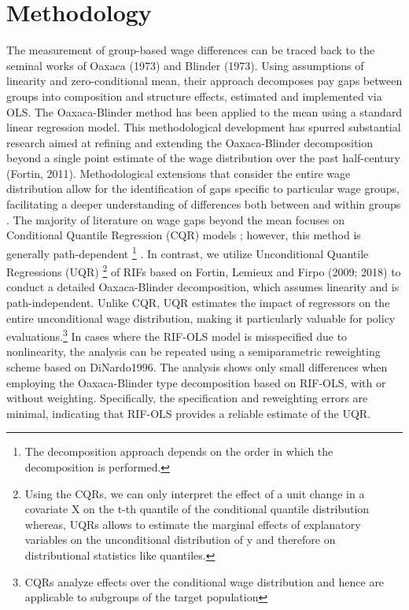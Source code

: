 \section{Methodology}

The measurement of group-based wage differences can be traced back to the seminal works of Oaxaca (1973) and Blinder (1973). Using assumptions of linearity and zero-conditional mean, their approach decomposes pay gaps between groups into composition and structure effects, estimated and implemented via OLS. The Oaxaca-Blinder method has been applied to the mean using a standard linear regression model. This methodological development has spurred substantial research aimed at refining and extending the Oaxaca-Blinder decomposition beyond a single point estimate of the wage distribution over the past half-century (Fortin, 2011). Methodological extensions that consider the entire wage distribution allow for the identification of gaps specific to particular wage groups, facilitating a deeper understanding of differences both between and within groups \parencite{Machado2005}. The majority of literature on wage gaps beyond the mean focuses on Conditional Quantile Regression (CQR) models \parencite{Machado2005, Buchinsky1998} ; however, this method is generally path-dependent \footnote{The decomposition approach depends on the order in which the decomposition is performed.} \parencite{Fortin2011}. In contrast, we utilize Unconditional Quantile Regressions (UQR) \footnote{Using the CQRs, we can only interpret the effect of a unit change in a covariate X on the t-th quantile of the conditional quantile distribution whereas, UQRs allows to estimate the marginal effects of explanatory variables on the unconditional distribution of y and therefore on distributional statistics like quantiles.} of RIFs based on Fortin, Lemieux and Firpo (2009; 2018) to conduct a detailed Oaxaca-Blinder decomposition, which assumes linearity and is path-independent. Unlike CQR, UQR estimates the impact of regressors on the entire unconditional wage distribution, making it particularly valuable for policy evaluations.\footnote{CQRs analyze effects over the conditional wage distribution and hence are applicable to subgroups of the target population} In cases where the RIF-OLS model is misspecified due to nonlinearity, the analysis can be repeated using a semiparametric reweighting scheme based on DiNardo1996. The analysis shows only small differences when employing the Oaxaca-Blinder type decomposition based on RIF-OLS, with or without weighting. Specifically, the specification and reweighting errors are minimal, indicating that RIF-OLS provides a reliable estimate of the UQR.


